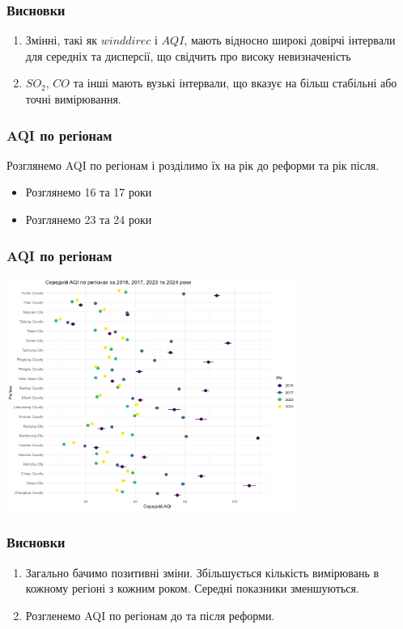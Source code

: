\documentclass{beamer}
\begin{document}
\begin{frame}[fragile=singleslide]
  \frametitle{Висновки}

  \begin{enumerate}
    \item Змінні, такі як $winddirec$ і $AQI$, мають відносно широкі 
    довірчі інтервали для середніх та дисперсії, що свідчить про високу
    невизначеність
    \item $SO_2$, $CO$ та інші мають вузькі інтервали, що вказує на
    більш стабільні або точні вимірювання.
  
  \end{enumerate}
\end{frame}

\begin{frame}
  \frametitle{AQI по регіонам}

  Розглянемо AQI по регіонам і розділимо їх на рік до реформи та рік після.

  \begin{itemize}
    \item Розглянемо 16 та 17 роки 
    \item Розглянемо 23 та 24 роки 
  \end{itemize}
\end{frame}

\begin{frame}
  \frametitle{AQI по регіонам}

  \begin{center}
    \includegraphics[height=3in]{./plots/lab2/1-4-part/aqi_by_year_region.png}
  \end{center}
\end{frame}

\begin{frame}
  \frametitle{Висновки}

  \begin{enumerate}
    \item Загально бачимо позитивні зміни. 
    Збільшується кількість вимірювань в кожному регіоні з кожним роком. 
    Середні показники зменшуються.
    \item Розгленемо AQI по регіонам до та після реформи.
  \end{enumerate}

  
\end{frame}
\end{document}
